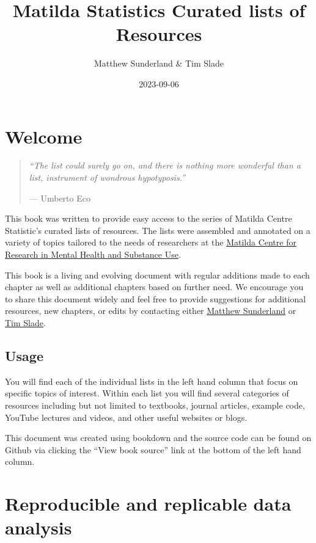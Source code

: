 \documentclass[
]{book}
\title{Matilda Statistics Curated lists of Resources}
\author{Matthew Sunderland \& Tim Slade}
\date{2023-09-06}
\begin{document}
\maketitle

{
\setcounter{tocdepth}{1}
\tableofcontents
}
\hypertarget{welcome}{%
\chapter{Welcome}\label{welcome}}

\begin{quote}
\emph{``The list could surely go on, and there is nothing more wonderful than a list, instrument of wondrous hypotyposis.''}

--- Umberto Eco
\end{quote}

This book was written to provide easy access to the series of Matilda Centre Statistic's curated lists of resources. The lists were assembled and annotated on a variety of topics tailored to the needs of researchers at the \href{https://www.sydney.edu.au/matilda-centre/}{Matilda Centre for Research in Mental Health and Substance Use}.

This book is a living and evolving document with regular additions made to each chapter as well as additional chapters based on further need. We encourage you to share this document widely and feel free to provide suggestions for additional resources, new chapters, or edits by contacting either \href{matthew.sunderland@sydney.edu.au}{Matthew Sunderland} or \href{tim.slade@sydney.edu.au}{Tim Slade}.

\hypertarget{usage}{%
\section{Usage}\label{usage}}

You will find each of the individual lists in the left hand column that focus on specific topics of interest. Within each list you will find several categories of resources including but not limited to textbooks, journal articles, example code, YouTube lectures and videos, and other useful websites or blogs.

This document was created using bookdown and the source code can be found on Github via clicking the ``View book source'' link at the bottom of the left hand column.

\hypertarget{reproducible-and-replicable-data-analysis}{%
\chapter{Reproducible and replicable data analysis}\label{reproducible-and-replicable-data-analysis}}
\end{document}
